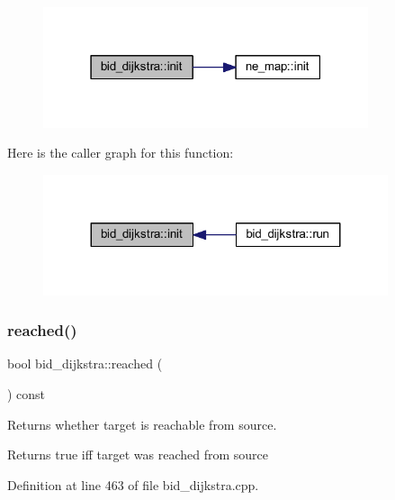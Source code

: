 \begin{figure}[H]
\begin{center}
\leavevmode
\includegraphics[width=271pt]{classbid__dijkstra_a3736aecbafb02384dd684d6d4fa4bd8d_cgraph}
\end{center}
\end{figure}
Here is the caller graph for this function\+:\nopagebreak
\begin{figure}[H]
\begin{center}
\leavevmode
\includegraphics[width=287pt]{classbid__dijkstra_a3736aecbafb02384dd684d6d4fa4bd8d_icgraph}
\end{center}
\end{figure}
\mbox{\label{classbid__dijkstra_a97f599b54fe9b030d87474898ff4a64c}} 
\subsubsection{\texorpdfstring{reached()}{reached()}}
{\footnotesize\ttfamily bool bid\+\_\+dijkstra\+::reached (\begin{DoxyParamCaption}{ }\end{DoxyParamCaption}) const}



Returns whether target is reachable from source. 

\begin{DoxyReturn}{Returns}
{\ttfamily true} iff target was reached from source 
\end{DoxyReturn}


Definition at line 463 of file bid\+\_\+dijkstra.\+cpp.


